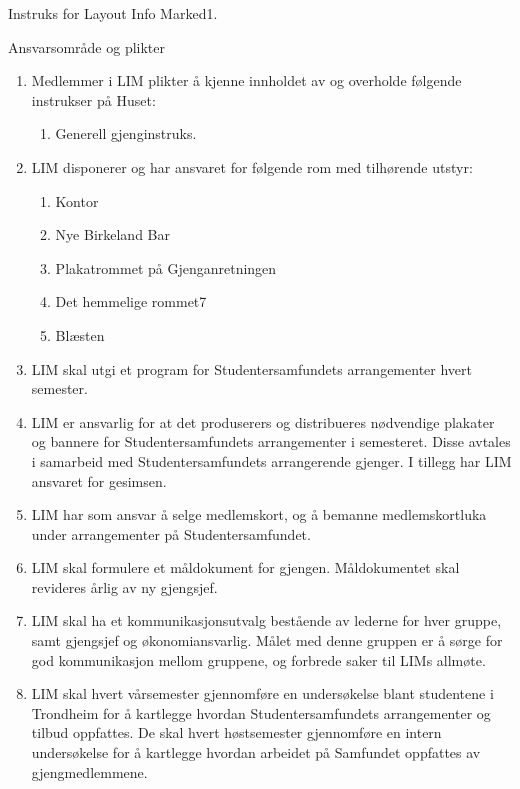 \begin{instruks}{Instruks for Layout Info Marked}{1. }{ }
    \begin{instruksledd}{Ansvarsområde og plikter}
        \begin{enumerate}   
            \item  Medlemmer i LIM plikter å kjenne innholdet av og overholde følgende instrukser på
                Huset:
                \begin{enumerate}
                    \item Generell gjenginstruks.
                \end{enumerate}
            \item LIM disponerer og har ansvaret for følgende rom med tilhørende utstyr:
                \begin{enumerate}
                    \item Kontor
                    \item Nye Birkeland Bar
                    \item Plakatrommet på Gjenganretningen
                    \item Det hemmelige rommet7
                    \item Blæsten
                \end{enumerate}
            \item LIM skal utgi et program for
                Studentersamfundets arrangementer hvert semester.
            \item LIM er ansvarlig for at det
                produserers og distribueres nødvendige plakater og bannere for
                Studentersamfundets
                arrangementer i semesteret. Disse avtales i samarbeid med Studentersamfundets
                arrangerende
                gjenger. I tillegg har LIM ansvaret for gesimsen.
            \item LIM har som ansvar å selge medlemskort, og å
                bemanne medlemskortluka under arrangementer på Studentersamfundet.
            \item LIM skal formulere et måldokument for
                gjengen. Måldokumentet skal revideres årlig av ny gjengsjef.
            \item LIM skal ha et kommunikasjonsutvalg
                bestående av lederne for hver gruppe, samt gjengsjef og
                økonomiansvarlig. Målet med denne gruppen er å sørge for god kommunikasjon mellom gruppene, og
                forbrede saker til LIMs allmøte.
            \item LIM skal hvert vårsemester gjennomføre en
                undersøkelse blant studentene i Trondheim for å kartlegge
                hvordan Studentersamfundets arrangementer og tilbud oppfattes. De skal hvert høstsemester
                gjennomføre en
                intern undersøkelse for å kartlegge hvordan arbeidet på Samfundet oppfattes av gjengmedlemmene.
        \end{enumerate}
    \end{instruksledd}


\end{instruks}
